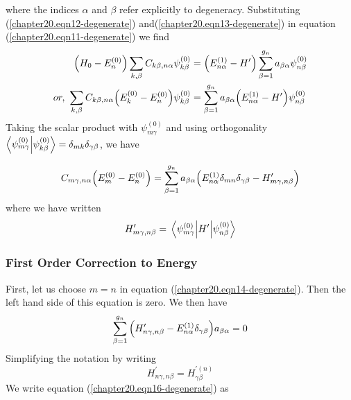 	where the indices $\alpha$ and $\beta$ refer explicitly to degeneracy. Substituting (\ref{chapter20.eqn12-degenerate}) and(\ref{chapter20.eqn13-degenerate}) in equation (\ref{chapter20.eqn11-degenerate}) we find
	\begin{align}
		\qty(H_0 - E_n^{(0)}) \sum_{k,\beta} C_{k\beta, n\alpha} \psi_{k \beta}^{(0)} 
		&= \qty(E_{n\alpha}^{(1)} - H^\prime) \sum_{\beta=1}^{g_n} a_{\beta\alpha} \psi_{n\beta}^{(0)} \\
		or,\ \sum_{k,\beta} C_{k\beta, n\alpha} \qty(E_k^{(0)} - E_n^{(0)}) \psi_{k \beta}^{(0)} 
		&= \sum_{\beta=1}^{g_n} a_{\beta\alpha} \qty(E_{n\alpha}^{(1)} - H^\prime) \psi_{n\beta}^{(0)} 
	\end{align}
	Taking the scalar product with $\psi_{m\gamma}^{(0)}$ and using orthogonality $\braket{\psi_{m\gamma}^{(0)}}{\psi_{k\beta}^{(0)}} = \delta_{m k} \delta_{\gamma \beta}$, we have
	
	\begin{equation}
		C_{m\gamma, n\alpha} \qty(E_m^{(0)} - E_n^{(0)}) = \sum_{\beta=1}^{g_n} a_{\beta\alpha} \qty(E_{n\alpha}^{(1)}\delta_{mn}\delta_{\gamma\beta}  -  H^\prime_{m\gamma,n\beta})
		\label{chapter20.eqn14-degenerate}
	\end{equation}
	where we have written
	\begin{equation}
		H^\prime_{m\gamma,n\beta} = \matrixel{\psi_{m\gamma}^{(0)}} {H^\prime} {\psi_{n\beta}^{(0)}}
		\label{chapter20.eqn15-degenerate}
	\end{equation}
	
	\subsubsection{First Order Correction to Energy}
	
	First, let us choose $m=n$ in equation (\ref{chapter20.eqn14-degenerate}). Then the left hand side of this equation is zero. We then have
	\begin{equation}
		\sum_{\beta=1}^{g_n} \qty(H^\prime_{n\gamma,n \beta}  -  E_{n\alpha}^{(1)}\delta_{\gamma \beta}) a_{\beta \alpha} = 0
		\label{chapter20.eqn16-degenerate}
	\end{equation}
	Simplifying the notation by writing
	\begin{equation}
		H^\prime_{n\gamma, n\beta} = H^{\prime (n)}_{\gamma\beta}
	\end{equation}
	We write equation (\ref{chapter20.eqn16-degenerate}) as
	

